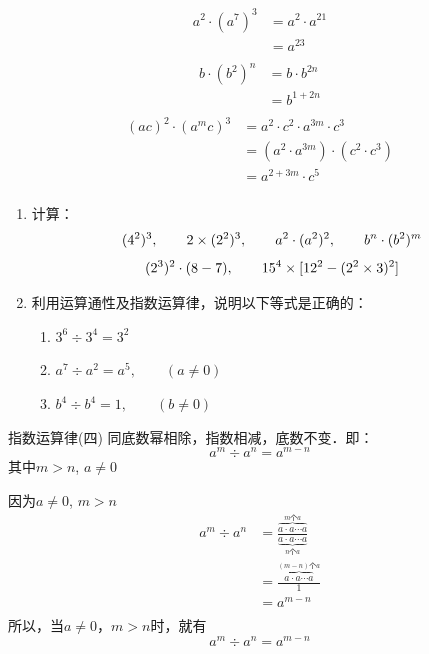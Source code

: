 \begin{solution}
	\begin{align*}
	a^2\cdot (a^7)^3&=a^2\cdot a^{21} \tag{指数运算律（三）}\\
	&= a^{23} \tag{指数运算律（一）}\\
	\end{align*}
	\begin{align*}
	b\cdot (b^2)^n&=b\cdot b^{2n} \tag{指数运算律（三）}\\
	&= b^{1+2n} \tag{指数运算律（一）}\\
	\end{align*}
	\begin{align*}
	(ac)^2\cdot (a^m c)^3&=a^2\cdot c^2\cdot a^{3m}\cdot c^3 \tag{指数运算律（三）}\\
	&=(a^2\cdot a^{3m})\cdot (c^2\cdot c^3) \tag{乘法交换、结合律}\\
	&= a^{2+3m}\cdot c^5 \tag{指数运算律（一）}\\
	\end{align*}        
\end{solution}

\begin{ex}
	\begin{enumerate}
		\item 计算：
		$$(4^2)^3,\qquad 2 \times (2^2)^3,\qquad a^2\cdot (a^2)^2,\qquad b^n\cdot (b^2)^m$$
		$$(2^3)^2 \cdot (8-7),\qquad       15^4 \times [12^2-(2^2 \times3)^2]$$
		\item 利用运算通性及指数运算律，说明以下等式是正确的：
		\begin{enumerate}
			\item $3^6\div 3^4=3^2$
			\item $a^7\div a^2=a^5,\qquad (a\ne 0)$
			\item $b^4\div b^4=1, \qquad (b\ne 0)$
		\end{enumerate}
		
	\end{enumerate}   
\end{ex}

\begin{blk}{指数运算律(四)}
	同底数幂相除，指数相减，底数不变．即：
	\[a^m \div a^n=a^{m-n}\]
	其中$m>n$,  $a\ne 0$
\end{blk}

\begin{rmk}
	因为$a\ne 0$, $m>n$
	\begin{align*}
	a^m \div a^n&=\frac{\overbrace{a\cdot a\cdots a}^{\text{$m$个$a$}}}{\underbrace{a\cdot a\cdots a}_{\text{$n$个$a$}}}  \tag{乘方的意义}\\
	&=\frac{\overbrace{a\cdot a\cdots a}^{\text{$(m-n)$个$a$}}}{1}  \tag{除法的性质}\\
	&=a^{m-n}\tag{乘方的意义}\\
	\end{align*}    
	所以，当$a\ne 0$，$m>n$时，就有
	\[a^m \div a^n=a^{m-n}\]
\end{rmk}


